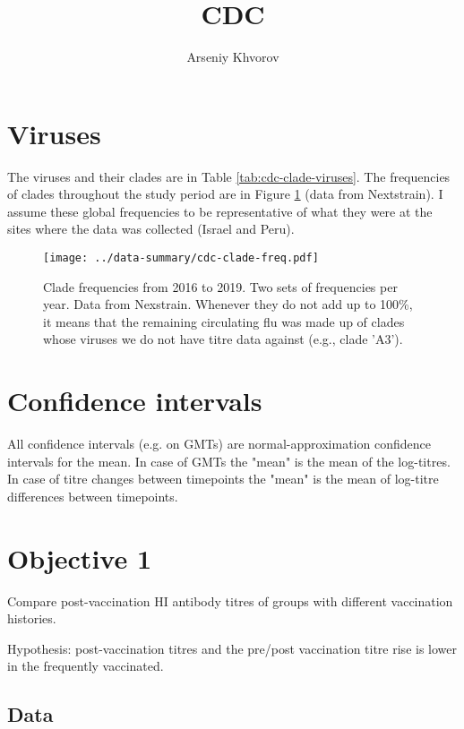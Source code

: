 \documentclass[12pt]{article}
\title{CDC}
\author{Arseniy Khvorov}
\begin{document}
\maketitle

\section{Viruses}

The viruses and their clades are in Table \ref{tab:cdc-clade-viruses}. The frequencies of clades throughout the study period are in Figure \ref{fig:cdc-clade-freq} (data from Nextstrain). I assume these global frequencies to be representative of what they were at the sites where the data was collected (Israel and Peru).



\begin{figure}
	\texttt{[image: ../data-summary/cdc-clade-freq.pdf]}
	\caption{Clade frequencies from 2016 to 2019. Two sets of frequencies per year. Data from Nexstrain. Whenever they do not add up to 100\%, it means that the remaining circulating flu was made up of clades whose viruses we do not have titre data against (e.g., clade 'A3').}
	\label{fig:cdc-clade-freq}
\end{figure}

\section{Confidence intervals}

All confidence intervals (e.g. on GMTs) are normal-approximation confidence intervals for the mean. In case of GMTs the "mean" is the mean of the log-titres. In case of titre changes between timepoints the "mean" is the mean of log-titre differences between timepoints.

\section{Objective 1}

Compare post-vaccination HI antibody titres of groups with different vaccination histories.

Hypothesis: post-vaccination titres and the pre/post vaccination titre rise
is lower in the frequently vaccinated.

\subsection{Data}
\end{document}
